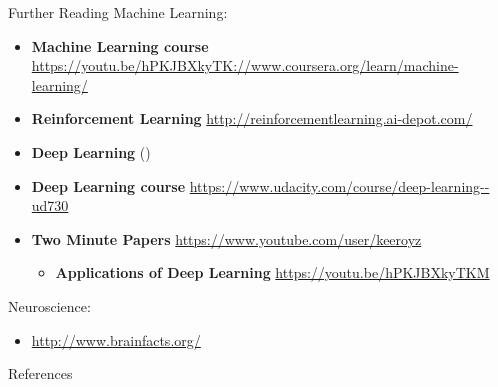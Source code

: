 \documentclass{beamer}
\begin{document}
\begin{frame}[allowframebreaks]{Further Reading}
    Machine Learning:
    \begin{itemize}
      \item \textbf{Machine Learning course} \url{https://youtu.be/hPKJBXkyTK://www.coursera.org/learn/machine-learning/}
      \item \textbf{Reinforcement Learning} \url{http://reinforcementlearning.ai-depot.com/}
      \item \textbf{Deep Learning} (\cite{Lecun2015deep})
      \item \textbf{Deep Learning course} \url{https://www.udacity.com/course/deep-learning--ud730}
      \item \textbf{Two Minute Papers} \url{https://www.youtube.com/user/keeroyz}
        \begin{itemize}
            \tiny
          \item \textbf{Applications of Deep Learning} \url{https://youtu.be/hPKJBXkyTKM}
        \end{itemize}
    \end{itemize}

    Neuroscience:
    \begin{itemize}
      \item \url{http://www.brainfacts.org/}
    \end{itemize}
  \end{frame}

  \begin{frame}[allowframebreaks]{References}
    \tiny
    \printbibliography[heading=none]
  \end{frame}
\end{document}
